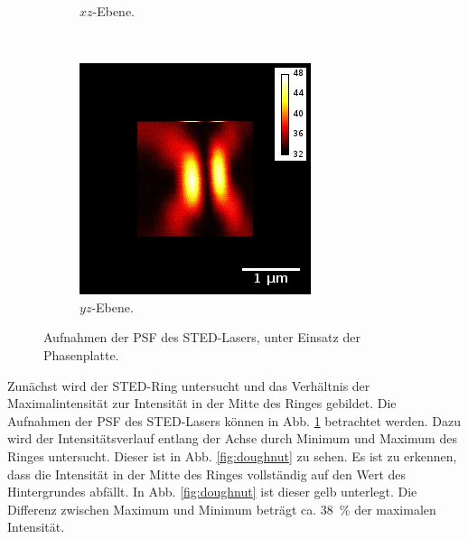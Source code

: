 \begin{figure}
\begin{subfigure}{0.3\textwidth	}
		\caption{$xz$-Ebene.}
	\end{subfigure}
	~
	\begin{subfigure}{0.3\textwidth	}
		\includegraphics[width=\textwidth]{plots/GoldBeads_3d_775nmyzwithbar.jpg}
		\caption{$yz$-Ebene.}
	\end{subfigure}
	\caption{Aufnahmen der PSF des STED-Lasers, unter Einsatz der Phasenplatte.}\label{fig:doughnut_psf}
\end{figure}
Zunächst wird der STED-Ring untersucht und das Verhältnis der Maximalintensität zur Intensität in der Mitte des Ringes gebildet.
Die Aufnahmen der PSF des STED-Lasers können in Abb. \ref{fig:doughnut_psf} betrachtet werden.
Dazu wird der Intensitätsverlauf entlang der Achse durch Minimum und Maximum des Ringes untersucht. Dieser ist in Abb. \ref{fig:doughnut} zu sehen.
Es ist zu erkennen, dass die Intensität in der Mitte des Ringes vollständig auf den Wert des Hintergrundes abfällt.
In Abb. \ref{fig:doughnut} ist dieser gelb unterlegt.
Die Differenz zwischen Maximum und Minimum beträgt ca. 38~\% der maximalen Intensität. 
